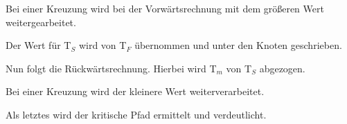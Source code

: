 \documentclass{beamer}
\begin{document}
\begin{frame}[t,shrink=65]
\begin{itemize}
{	  \item<only@+>{Bei einer Kreuzung wird bei der Vorwärtsrechnung mit dem größeren Wert weitergearbeitet.}
	  
	  \item<only@+>{Der Wert für T$_{S}$ wird von  T$_{F}$ übernommen und unter den Knoten geschrieben.}
	  
	  \item<only@+>{Nun folgt die Rückwärtsrechnung. Hierbei wird T$_{m}$ von T$_{S}$ abgezogen.}
	  
	  \item<only@+>{Bei einer Kreuzung wird der kleinere Wert weiterverarbeitet.}
	  
	  \item<only@+>{Als letztes wird der kritische Pfad ermittelt und verdeutlicht.}
	  	
	  
	\item \alert<+> {}
}
\end{itemize}
	
\end{frame}
\end{document}
